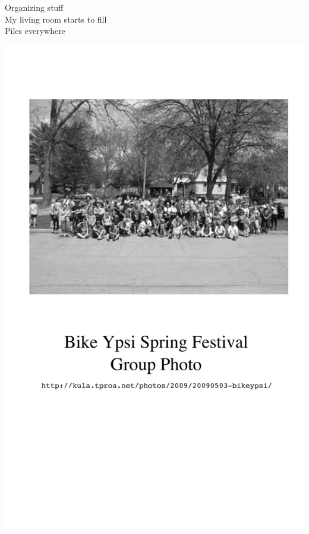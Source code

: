 \documentclass[12pt]{article}
\begin{document}
Organizing stuff \\
My living room starts to fill \\
Piles everywhere

\newpage

\includegraphics{back.png}

\newpage
\end{document}
